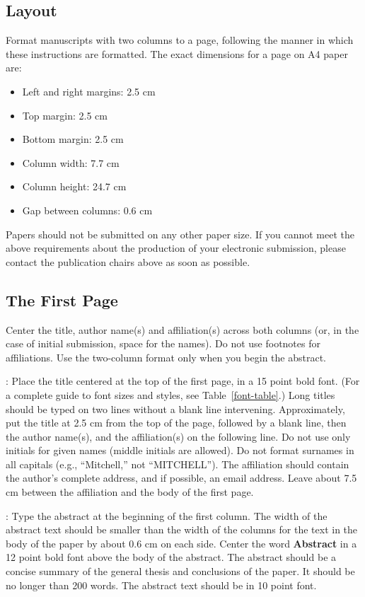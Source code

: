 \subsection{Layout}
\label{ssec:layout}

Format manuscripts with two columns to a page, following the manner in
which these instructions are formatted. The exact dimensions for a page
on A4 paper are:

\begin{itemize}
\item Left and right margins: 2.5 cm
\item Top margin: 2.5 cm
\item Bottom margin: 2.5 cm
\item Column width: 7.7 cm
\item Column height: 24.7 cm
\item Gap between columns: 0.6 cm
\end{itemize}

\noindent Papers should not be submitted on any other paper size.
 If you cannot meet the above requirements about the production of 
 your electronic submission, please contact the publication chairs 
 above as soon as possible.

\subsection{The First Page}
\label{ssec:first}

Center the title, author name(s) and affiliation(s) across both
columns (or, in the case of initial submission, space for the names). 
Do not use footnotes for affiliations.  
Use the two-column format only when you begin the abstract.

: Place the title centered at the top of the first
page, in a 15 point bold font.  (For a complete guide to font sizes and
styles, see Table~\ref{font-table}.) Long titles should be typed on two
lines without a blank line intervening. Approximately, put the title at
2.5 cm from the top of the page, followed by a blank line, then the author
name(s), and the affiliation(s) on the following line.  Do not use only
initials for given names (middle initials are allowed). Do not format
surnames in all capitals (e.g., ``Mitchell,'' not ``MITCHELL'').  The
affiliation should contain the author's complete address, and if possible,
an email address. Leave about 7.5 cm between the affiliation and the body
of the first page.

: Type the abstract at the beginning of the first
column.  The width of the abstract text should be smaller than the
width of the columns for the text in the body of the paper by about
0.6 cm on each side.  Center the word {\bf Abstract} in a 12 point
bold font above the body of the abstract. The abstract should be a
concise summary of the general thesis and conclusions of the paper.
It should be no longer than 200 words.  The abstract text should be in
10 point font.

